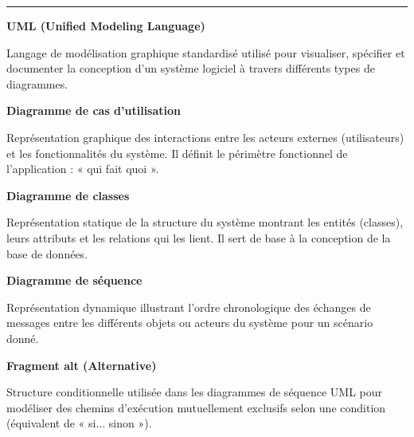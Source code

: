 \documentclass[12pt,a4paper]{report}
\begin{document}
\vspace{0.2cm}
{\textcolor{grismoyen}{\rule{\textwidth}{0.4pt}}}

\vspace{0.6cm}

\begin{infobox}
\textbf{UML (Unified Modeling Language)}

Langage de modélisation graphique standardisé utilisé pour visualiser, spécifier et documenter la conception d'un système logiciel à travers différents types de diagrammes.
\end{infobox}

\vspace{0.6cm}

\begin{infobox}
\textbf{Diagramme de cas d'utilisation}

Représentation graphique des interactions entre les acteurs externes (utilisateurs) et les fonctionnalités du système. Il définit le périmètre fonctionnel de l'application : « qui fait quoi ».
\end{infobox}

\vspace{0.6cm}

\begin{infobox}
\textbf{Diagramme de classes}

Représentation statique de la structure du système montrant les entités (classes), leurs attributs et les relations qui les lient. Il sert de base à la conception de la base de données.
\end{infobox}

\vspace{0.6cm}

\begin{infobox}
\textbf{Diagramme de séquence}

Représentation dynamique illustrant l'ordre chronologique des échanges de messages entre les différents objets ou acteurs du système pour un scénario donné.
\end{infobox}

\vspace{0.6cm}

\begin{infobox}
\textbf{Fragment alt (Alternative)}

Structure conditionnelle utilisée dans les diagrammes de séquence UML pour modéliser des chemins d'exécution mutuellement exclusifs selon une condition (équivalent de « si... sinon »).
\end{infobox}
\end{document}
